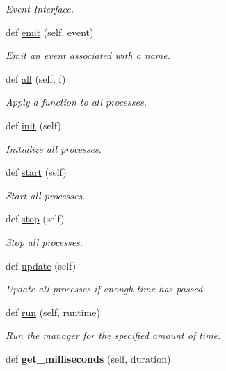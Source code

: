 \begin{DoxyCompactItemize}
\begin{DoxyCompactList}\small\item\em Event Interface. \end{DoxyCompactList}\item 
def \hyperlink{classelma_1_1api_1_1manager_1_1Manager_a8c842ef67392a11900ce089e05b23c58}{emit} (self, event)
\begin{DoxyCompactList}\small\item\em Emit an event associated with a name. \end{DoxyCompactList}\item 
def \hyperlink{classelma_1_1api_1_1manager_1_1Manager_a4e451c5cd548a0086536fa9c990b338e}{all} (self, f)
\begin{DoxyCompactList}\small\item\em Apply a function to all processes. \end{DoxyCompactList}\item 
def \hyperlink{classelma_1_1api_1_1manager_1_1Manager_a724e1c80f53aff3430bc465a5671ddee}{init} (self)
\begin{DoxyCompactList}\small\item\em Initialize all processes. \end{DoxyCompactList}\item 
def \hyperlink{classelma_1_1api_1_1manager_1_1Manager_a7e9916576b109e0d633c55e3854d1b78}{start} (self)
\begin{DoxyCompactList}\small\item\em Start all processes. \end{DoxyCompactList}\item 
def \hyperlink{classelma_1_1api_1_1manager_1_1Manager_a0feb4a517ab5840dcb6d8e15d33f22be}{stop} (self)
\begin{DoxyCompactList}\small\item\em Stop all processes. \end{DoxyCompactList}\item 
def \hyperlink{classelma_1_1api_1_1manager_1_1Manager_acb942259598dffdb074bea5171f0e2e9}{update} (self)
\begin{DoxyCompactList}\small\item\em Update all processes if enough time has passed. \end{DoxyCompactList}\item 
def \hyperlink{classelma_1_1api_1_1manager_1_1Manager_a241f798dcfb0cda2a47d744d8713c456}{run} (self, runtime)
\begin{DoxyCompactList}\small\item\em Run the manager for the specified amount of time. \end{DoxyCompactList}\item 
\mbox{\label{classelma_1_1api_1_1manager_1_1Manager_ab077b5cf1492213bc057f6a19fc78950}} 
def {\bfseries get\+\_\+milliseconds} (self, duration)
\end{DoxyCompactItemize}
